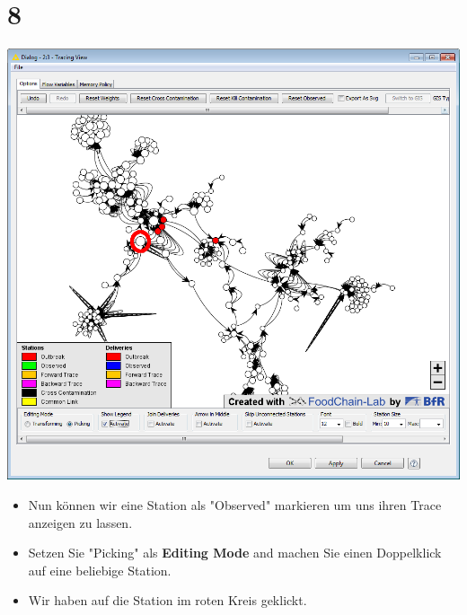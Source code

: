 \documentclass{beamer}
\begin{document}
\section{8}
\begin{frame}
	\begin{center}
  		\includegraphics[height=0.6\textheight]{8.png}
	\end{center}
	\begin{itemize}
		\item Nun können wir eine Station als "Observed" markieren um uns ihren Trace anzeigen zu lassen.
		\item Setzen Sie "Picking" als \textbf{Editing Mode} and machen Sie einen Doppelklick auf eine beliebige Station.
		\item Wir haben auf die Station im roten Kreis geklickt.
	\end{itemize}
\end{frame}
\end{document}
